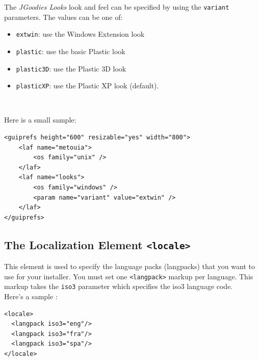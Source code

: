 The \textit{JGoodies Looks} look and feel can be specified by using the
\texttt{variant} parameters. The values can be one of:
\begin{itemize}

  \item \texttt{extwin}: use the Windows Extension look
  \item \texttt{plastic}: use the basic Plastic look
  \item \texttt{plastic3D}: use the Plastic 3D look
  \item \texttt{plasticXP}: use the Plastic XP look (default).

\end{itemize}\

Here is a small sample:
\begin{verbatim}
<guiprefs height="600" resizable="yes" width="800">
    <laf name="metouia">
        <os family="unix" />
    </laf>
    <laf name="looks">
        <os family="windows" />
        <param name="variant" value="extwin" />
    </laf>
</guiprefs>
\end{verbatim}

\subsection{The Localization Element \texttt{<locale>}}
\label{localization-element}

This element is used to specify the language packs (langpacks) that you want to
use for your installer. You must set one \texttt{<langpack>} markup per
language. This markup takes the \texttt{iso3} parameter which specifies the iso3
language code.\\

Here's a sample :\\
\footnotesize
\begin{verbatim}
<locale>
  <langpack iso3="eng"/>
  <langpack iso3="fra"/>
  <langpack iso3="spa"/>
</locale>
\end{verbatim}\
\normalsize

